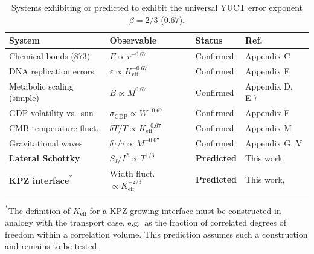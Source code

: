 \documentclass[12pt,a4paper]{article}
\newcommand{\Keff}{K_{\mathrm{eff}}}
\begin{document}
	\begin{table}[H]
		\centering
		\caption{Systems exhibiting or predicted to exhibit the
			universal YUCT error exponent $\beta = 2/3$ ($0.67$).}
		\label{tab:universal-beta}
		\begin{tabular}{@{}llll@{}}
			\toprule
			\textbf{System} & \textbf{Observable} & \textbf{Status} & \textbf{Ref.}\\
			\midrule
			Chemical bonds (873)      & $E \propto r^{-0.67}$               & Confirmed  & Appendix C \\
			DNA replication errors    & $\varepsilon \propto \Keff^{-0.67}$ & Confirmed  & Appendix E \\
			Metabolic scaling (simple)& $B \propto M^{0.67}$               & Confirmed  & Appendix D, E.7 \\
			GDP volatility vs.\ sun   & $\sigma_{\mathrm{GDP}} \propto W^{-0.67}$ & Confirmed & Appendix F \\
			CMB temperature fluct.    & $\delta T/T \propto \Keff^{-0.67}$ & Confirmed  & Appendix M \\
			Gravitational waves       & $\delta\tau/\tau \propto M^{-0.67}$& Confirmed  & Appendix G, V \\
			\textbf{Lateral Schottky} & $S_I/I^2 \propto T^{1/3}$          & \textbf{Predicted} & This work \\
			\textbf{KPZ interface}\textsuperscript{*} & Width fluct. $\propto \Keff^{-2/3}$& \textbf{Predicted} & This work, \cite{KPZ}\\
			\bottomrule
		\end{tabular}
		
		\vspace{0.3cm}
		{\footnotesize \textsuperscript{*}The definition of $K_{\mathrm{eff}}$ for a KPZ growing interface must be constructed in analogy with the transport case, e.g.\ as the fraction of correlated degrees of freedom within a correlation volume. This prediction assumes such a construction and remains to be tested.}
	\end{table}
	
\end{document}
